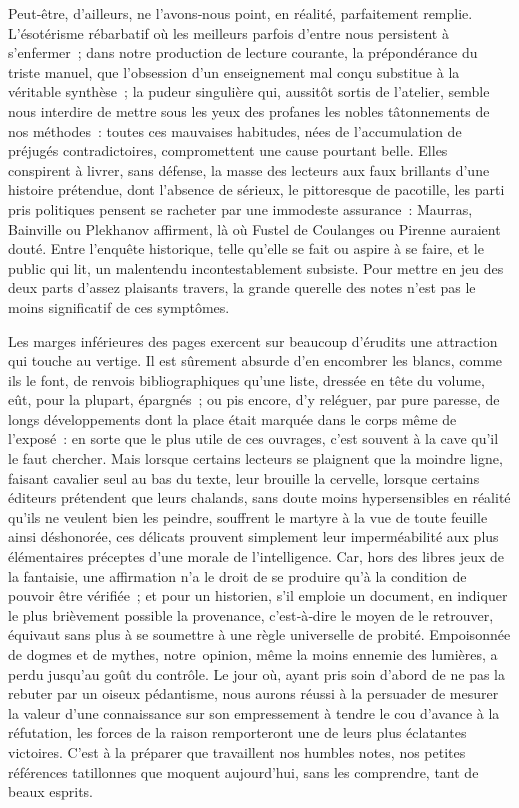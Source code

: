 \documentclass[french,twoside]{book} %
\newcommand{\astermono}{\medskip\centerline{\color{rubric}\large\selectfont{\syms ✻}}\medskip\par}%
\begin{document}
\astermono

\noindent Peut‑être, d’ailleurs, ne l’avons‑nous point, en réalité, parfaitement remplie. L’ésotérisme rébarbatif où les meilleurs parfois d’entre nous persistent à s’enfermer ; dans notre production de lecture courante, la prépondérance du triste manuel, que l’obsession d’un enseignement mal conçu substitue à la véritable synthèse ; la pudeur singulière qui, aussitôt sortis de l’atelier, semble nous interdire de mettre sous les yeux des pro­fanes les nobles tâtonnements de nos méthodes : toutes ces mauvaises habitudes, nées de l’accumulation de préjugés contradictoires, compro­mettent une cause pourtant belle. Elles conspirent à livrer, sans défense, la masse des lecteurs aux faux brillants d’une histoire prétendue, dont l’absence de sérieux, le pittoresque de pacotille, les parti pris politiques pensent se racheter par une immodeste assurance : Maurras, Bainville ou Plekhanov affirment, là où Fustel de Coulanges ou Pirenne auraient douté. Entre l’enquête historique, telle qu’elle se fait ou aspire à se faire, et le public qui lit, un malentendu incontestablement subsiste. Pour mettre en jeu des deux parts d’assez plaisants travers, la grande querelle des notes n’est pas le moins significatif de ces symptômes.\par
\label{p40} Les marges inférieures des pages exercent sur beaucoup d’érudits une attraction qui touche au vertige. Il est sûrement absurde d’en encombrer les blancs, comme ils le font, de renvois bibliographiques qu’une liste, dressée en tête du volume, eût, pour la plupart, épargnés ; ou pis encore, d’y relé­guer, par pure paresse, de longs développements dont la place était mar­quée dans le corps même de l’exposé : en sorte que le plus utile de ces ouvrages, c’est souvent à la cave qu’il le faut chercher. Mais lorsque certains lecteurs se plaignent que la moindre ligne, faisant cavalier seul au bas du texte, leur brouille la cervelle, lorsque certains éditeurs préten­dent que leurs chalands, sans doute moins hypersensibles en réalité qu’ils ne veulent bien les peindre, souffrent le martyre à la vue de toute feuille ainsi déshonorée, ces délicats prouvent simplement leur imperméabilité aux plus élémentaires préceptes d’une morale de l’intelligence. Car, hors des libres jeux de la fantaisie, une affirmation n’a le droit de se produire qu’à la condition de pouvoir être vérifiée ; et pour un historien, s’il emploie un document, en indiquer le plus brièvement possible la provenance, c’est‑à‑dire le moyen de le retrouver, équivaut sans plus à se soumettre à une règle universelle de probité. Empoisonnée de dogmes et de mythes, notre opinion, même la moins ennemie des lumières, a perdu jusqu’au goût du contrôle. Le jour où, ayant pris soin d’abord de ne pas la rebuter par un oiseux pédantisme, nous aurons réussi à la persuader de mesurer la valeur d’une connaissance sur son empressement à tendre le cou d’avance à la réfutation, les forces de la raison remporteront une de leurs plus éclatantes victoires. C’est à la préparer que travaillent nos humbles notes, nos petites références tatillonnes que moquent aujourd’hui, sans les comprendre, tant de beaux esprits.\par
\end{document}
